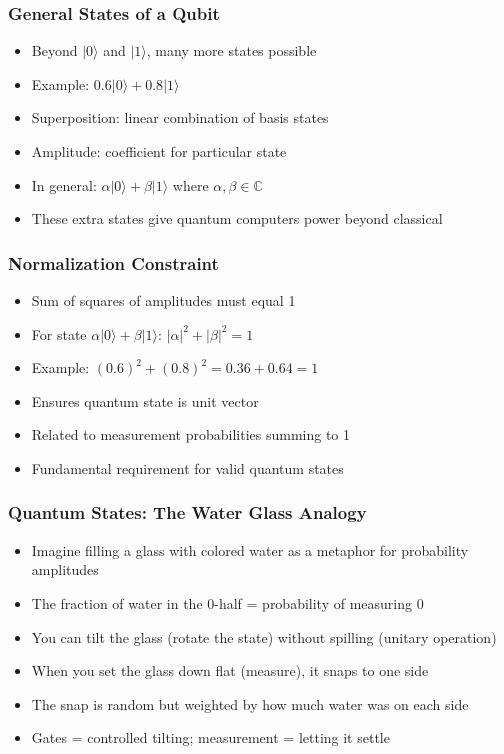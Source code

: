 \begin{frame}[fragile]\frametitle{General States of a Qubit}
\begin{itemize}
\item Beyond $|0\rangle$ and $|1\rangle$, many more states possible
\item Example: $0.6|0\rangle + 0.8|1\rangle$
\item Superposition: linear combination of basis states
\item Amplitude: coefficient for particular state
\item In general: $\alpha|0\rangle + \beta|1\rangle$ where $\alpha, \beta \in \mathbb{C}$
\item These extra states give quantum computers power beyond classical
\end{itemize}
\end{frame}

\begin{frame}[fragile]\frametitle{Normalization Constraint}
\begin{itemize}
\item Sum of squares of amplitudes must equal 1
\item For state $\alpha|0\rangle + \beta|1\rangle$: $|\alpha|^2 + |\beta|^2 = 1$
\item Example: $(0.6)^2 + (0.8)^2 = 0.36 + 0.64 = 1$ \checkmark
\item Ensures quantum state is unit vector
\item Related to measurement probabilities summing to 1
\item Fundamental requirement for valid quantum states
\end{itemize}
\end{frame}

\begin{frame}[fragile]\frametitle{Quantum States: The Water Glass Analogy}
\begin{itemize}
\item Imagine filling a glass with colored water as a metaphor for probability amplitudes
\item The fraction of water in the 0-half = probability of measuring 0
\item You can tilt the glass (rotate the state) without spilling (unitary operation)
\item When you set the glass down flat (measure), it snaps to one side
\item The snap is random but weighted by how much water was on each side
\item Gates = controlled tilting; measurement = letting it settle
\end{itemize}
\end{frame}


